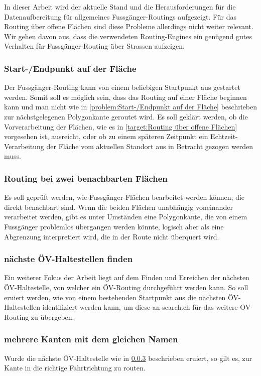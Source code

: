 In dieser Arbeit wird der aktuelle Stand und die Herausforderungen für die Datenaufbereitung für allgemeines Fussgänger-Routings aufgezeigt. Für das Routing über offene Flächen sind diese Probleme allerdings nicht weiter relevant. Wir gehen davon aus, dass die verwendeten Routing-Engines ein genügend gutes Verhalten für Fussgänger-Routing über Strassen aufzeigen.

\subsubsection{Start-/Endpunkt auf der Fläche}
\label{target:Start-/Endpunkt auf der Fläche}
Der Fussgänger-Routing kann von einem beliebigen Startpunkt aus gestartet werden. Somit soll es möglich sein, dass das Routing auf einer Fläche beginnen kann und man nicht wie in \ref{problem:Start-/Endpunkt auf der Fläche} beschrieben zur nächstgelegenen Polygonkante geroutet wird. Es soll geklärt werden, ob die Vorverarbeitung der Flächen, wie es in \ref{target:Routing über offene Flächen} vorgesehen ist, ausreicht, oder ob zu einem späteren Zeitpunkt ein Echtzeit-Verarbeitung der Fläche vom aktuellen Standort aus in Betracht gezogen werden muss.

\subsubsection{Routing bei zwei benachbarten Flächen}
\label{target:Routing bei zwei benachbarten Flächen}

Es soll geprüft werden, wie Fussgänger-Flächen bearbeitet werden können, die direkt benachbart sind. Wenn die beiden Flächen unabhängig voneinander verarbeitet werden, gibt es unter Umständen eine Polygonkante, die von einem Fussgänger problemlos übergangen werden könnte, logisch aber als eine Abgrenzung interpretiert wird, die in der Route nicht überquert wird.

\subsubsection{nächste ÖV-Haltestellen finden}
\label{target:nächste ÖV-Haltestellen finden}
Ein weiterer Fokus der Arbeit liegt auf dem Finden und Erreichen der nächsten ÖV-Haltestelle, von welcher ein ÖV-Routing durchgeführt werden kann. So soll eruiert werden, wie von einem bestehenden Startpunkt aus die nächsten ÖV-Haltestellen identifiziert werden kann, um diese an search.ch für das weitere ÖV-Routing zu übergeben.

\subsubsection{mehrere Kanten mit dem gleichen Namen}
\label{target:mehrere Kanten mit dem gleichen Namen}
Wurde die nächste ÖV-Haltestelle wie in \ref{target:nächste ÖV-Haltestellen finden} beschrieben eruiert, so gilt es, zur \gls{Kante} in die richtige Fahrtrichtung zu routen.

